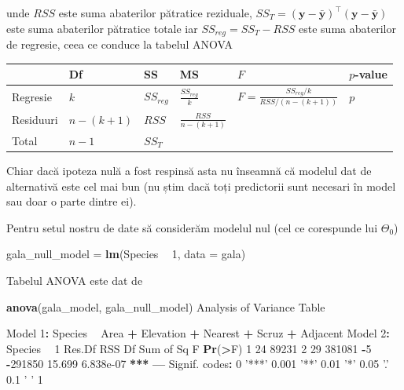 \documentclass[]{article}
\newenvironment{Shaded}{\begin{snugshade}}{\end{snugshade}}
\newcommand{\KeywordTok}[1]{\textcolor[rgb]{0.13,0.29,0.53}{\textbf{#1}}}
\newcommand{\DataTypeTok}[1]{\textcolor[rgb]{0.13,0.29,0.53}{#1}}
\newcommand{\DecValTok}[1]{\textcolor[rgb]{0.00,0.00,0.81}{#1}}
\newcommand{\FloatTok}[1]{\textcolor[rgb]{0.00,0.00,0.81}{#1}}
\newcommand{\StringTok}[1]{\textcolor[rgb]{0.31,0.60,0.02}{#1}}
\newcommand{\OperatorTok}[1]{\textcolor[rgb]{0.81,0.36,0.00}{\textbf{#1}}}
\newcommand{\ErrorTok}[1]{\textcolor[rgb]{0.64,0.00,0.00}{\textbf{#1}}}
\newcommand{\NormalTok}[1]{#1}
\begin{document}
unde \(RSS\) este suma abaterilor pătratice reziduale,
\(SS_T=(\boldsymbol y - \bar{\boldsymbol y})^\intercal(\boldsymbol y - \bar{\boldsymbol y})\)
este suma abaterilor pătratice totale iar \(SS_{reg}=SS_{T}-RSS\) este
suma abaterilor de regresie, ceea ce conduce la tabelul ANOVA

\begin{longtable}[]{@{}llllll@{}}
\toprule
& Df & SS & MS & \(F\) & \(p\)-value\tabularnewline
\midrule
\endhead
Regresie & \(k\) & \(SS_{reg}\) & \(\frac{SS_{reg}}{k}\) &
\(F=\frac{SS_{reg}/k}{RSS/(n-(k+1))}\) & \(p\)\tabularnewline
Residuuri & \(n - (k+1)\) & \(RSS\) & \(\frac{RSS}{n-(k+1)}\) &
&\tabularnewline
Total & \(n-1\) & \(SS_{T}\) & & &\tabularnewline
\bottomrule
\end{longtable}

Chiar dacă ipoteza nulă a fost respinsă asta nu înseamnă că modelul dat
de alternativă este cel mai bun (nu știm dacă toți predictorii sunt
necesari în model sau doar o parte dintre ei).

Pentru setul nostru de date să considerăm modelul nul (cel ce corespunde
lui \(\Theta_0\))

\begin{Shaded}
\begin{Highlighting}[]
\NormalTok{gala_null_model =}\StringTok{ }\KeywordTok{lm}\NormalTok{(Species }\OperatorTok{~}\StringTok{ }\DecValTok{1}\NormalTok{, }\DataTypeTok{data =}\NormalTok{ gala)}
\end{Highlighting}
\end{Shaded}

Tabelul ANOVA este dat de

\begin{Shaded}
\begin{Highlighting}[]
\KeywordTok{anova}\NormalTok{(gala_model, gala_null_model)}
\NormalTok{Analysis of Variance Table}

\NormalTok{Model }\DecValTok{1}\OperatorTok{:}\StringTok{ }\NormalTok{Species }\OperatorTok{~}\StringTok{ }\NormalTok{Area }\OperatorTok{+}\StringTok{ }\NormalTok{Elevation }\OperatorTok{+}\StringTok{ }\NormalTok{Nearest }\OperatorTok{+}\StringTok{ }\NormalTok{Scruz }\OperatorTok{+}\StringTok{ }\NormalTok{Adjacent}
\NormalTok{Model }\DecValTok{2}\OperatorTok{:}\StringTok{ }\NormalTok{Species }\OperatorTok{~}\StringTok{ }\DecValTok{1}
\NormalTok{  Res.Df    RSS Df Sum of Sq      F    }\KeywordTok{Pr}\NormalTok{(}\OperatorTok{>}\NormalTok{F)    }
\DecValTok{1}     \DecValTok{24}  \DecValTok{89231}                                  
\DecValTok{2}     \DecValTok{29} \DecValTok{381081} \OperatorTok{-}\DecValTok{5}   \OperatorTok{-}\DecValTok{291850} \FloatTok{15.699} \FloatTok{6.838e-07} \OperatorTok{**}\ErrorTok{*}
\OperatorTok{---}
\NormalTok{Signif. codes}\OperatorTok{:}\StringTok{  }\DecValTok{0} \StringTok{'***'} \FloatTok{0.001} \StringTok{'**'} \FloatTok{0.01} \StringTok{'*'} \FloatTok{0.05} \StringTok{'.'} \FloatTok{0.1} \StringTok{' '} \DecValTok{1}
\end{Highlighting}
\end{Shaded}
\end{document}
